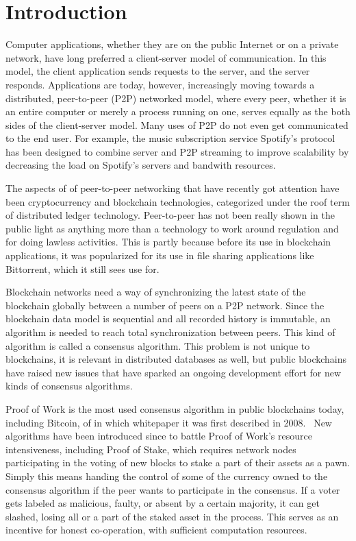 \chapter{Introduction}
\label{Introduction}

Computer applications, whether they are on the public Internet or on a private network, have long preferred a client-server model of communication. In this model, the client application sends requests to the server, and the server responds. Applications are today, however, increasingly moving towards a distributed, peer-to-peer (P2P) networked model, where every peer, whether it is an entire computer or merely a process running on one, serves equally as the both sides of the client-server model. Many uses of P2P do not even get communicated to the end user. For example, the music subscription service Spotify's protocol has been designed to combine server and P2P streaming to improve scalability by decreasing the load on Spotify's servers and bandwith resources.\cite{Kreitz_undated-yp} 

The aspects of of peer-to-peer networking that have recently got attention have been cryptocurrency and blockchain technologies, categorized under the roof term of distributed ledger technology. Peer-to-peer has not been really shown in the public light as anything more than a technology to work around regulation and for doing lawless activities. This is partly because before its use in blockchain applications, it was popularized for its use in file sharing applications like Bittorrent, which it still sees use for. 

Blockchain networks need a way of synchronizing the latest state of the blockchain globally between a number of peers on a P2P network. Since the blockchain data model is sequential and all recorded history is immutable, an algorithm is needed to reach total synchronization between peers. This kind of algorithm is called a consensus algorithm. This problem is not unique to blockchains, it is relevant in distributed databases as well, but public blockchains have raised new issues that have sparked an ongoing development effort for new kinds of consensus algorithms.

Proof of Work is the most used consensus algorithm in public blockchains today, including Bitcoin, of in which whitepaper it was first described in 2008.~\cite{Nakamoto2019-ax} New algorithms have been introduced since to battle Proof of Work's resource intensiveness, including Proof of Stake, which requires network nodes participating in the voting of new blocks to stake a part of their assets as a pawn. Simply this means handing the control of some of the currency owned to the consensus algorithm if the peer wants to participate in the consensus. If a voter gets labeled as malicious, faulty, or absent by a certain majority, it can get slashed, losing all or a part of the staked asset in the process. This serves as an incentive for honest co-operation, with sufficient computation resources.

